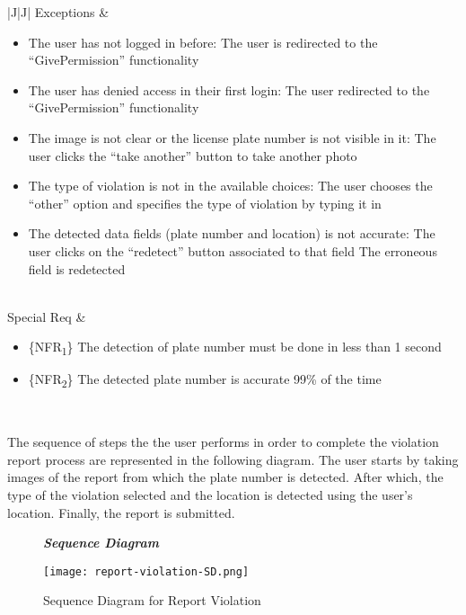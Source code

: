 \begin{table}[H]
\begin{tabulary}{\textwidth}{|J|J|}
\hline
Exceptions      & 
\begin{minipage}[t]{0.8\textwidth}
\begin{itemize} 
\item The user has not logged in before: The user is redirected to the “GivePermission” functionality
\item The user has denied access in their first login:   The user redirected to the “GivePermission” functionality
\item The image is not clear or the license plate number is not visible in it: The user clicks the “take another” button to take another photo
\item The type of violation is not in the available choices: The user chooses the “other” option and specifies the type of violation by typing it in
\item The detected data fields (plate number and location) is not accurate: The user clicks on the “redetect” button associated to that field The erroneous field is redetected\\
\end{itemize}
\end{minipage}\\
\hline
Special Req     & 
\begin{minipage}[t]{0.8\textwidth}
\begin{itemize}
\item \{NFR\textsubscript{1}\} The detection of plate number must be done in less than 1 second
\item \{NFR\textsubscript{2}\} The detected plate number is accurate 99\% of the time
\end{itemize}
\end{minipage}\\
\hline
\end{tabulary}
\caption{\label{tab:report-usecase}Usecase for Report Violation}
\end{table}

The sequence of steps the the user performs in order to complete the violation report process are represented in the following diagram. The user starts by taking images of the report from which the plate number is detected. After which, the type of the violation selected and the location is detected using the user's location. Finally, the report is submitted.


\begin{figure}[H]
\begin{flushleft}\emph{\textbf{Sequence Diagram}}\end{flushleft}
\caption{Sequence Diagram for Report Violation}
\label{fig:report-violation-SD}
\centering
\texttt{[image: report-violation-SD.png]}
\end{figure}



